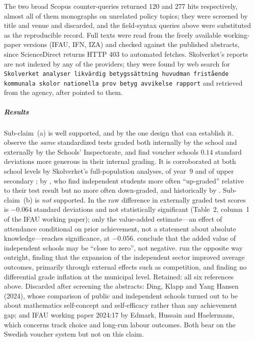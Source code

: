 The two broad Scopus counter-queries returned 120 and 277 hits
respectively, almost all of them monographs on unrelated policy topics;
they were screened by title and venue and discarded, and the field-syntax
queries above were substituted as the reproducible record.
Full texts were read from the freely available working-paper versions
(IFAU, IFN, IZA) and checked against the published abstracts, since
ScienceDirect returns HTTP 403 to automated fetches.
Skolverket's reports are not indexed by any of the providers; they were
found by web search for
\texttt{Skolverket analyser likvärdig betygssättning huvudman fristående
kommunala skolor nationella prov betyg avvikelse rapport} and retrieved
from the agency, after \textcite{EdmarkPersson2021} pointed to them.

\subparagraph{Results}
Sub-claim~(a) is well supported, and by the one design that can establish
it.  \Textcite{HinnerichVlachos2017} observe the \emph{same} standardized
tests graded both internally by the school and externally by the Schools'
Inspectorate, and find voucher schools \(0.14\) standard deviations more
generous in their internal grading.  It is corroborated at both school
levels by Skolverket's full-population analyses, of year~9
\autocite{Skolverket2019Betyg} and of upper secondary
\autocite{Skolverket2020Betyg}; by \textcite{EdmarkPersson2021}, who find independent
students more often \enquote{up-graded} relative to their test result but
no more often down-graded, and historically by
\textcite{WikstromWikstrom2005}.
Sub-claim~(b) is \emph{not} supported.  In
\textcite{HinnerichVlachos2017} the raw difference in externally graded
test scores is \(-0.064\) standard deviations and not statistically
significant (Table~2, column~1 of the IFAU working paper); only the
value-added estimate---an effect of attendance conditional on prior
achievement, not a statement about absolute knowledge---reaches
significance, at \(-0.056\).  \Textcite{EdmarkPersson2021} conclude that
the added value of independent schools may be \enquote{close to zero},
not negative.  \Textcite{BohlmarkLindahl2015} run the opposite way
outright, finding that the expansion of the independent sector improved
average outcomes, primarily through external effects such as competition,
and finding no differential grade inflation at the municipal level.
Retained: all six references above.
Discarded after screening the abstracts: Ding, Klapp and Yang Hansen
(2024), whose comparison of public and independent schools turned out to
be about mathematics self-concept and self-efficacy rather than any
achievement gap; and IFAU working paper 2024:17 by Edmark, Hussain and
Haelermans, which concerns track choice and long-run labour outcomes.
Both bear on the Swedish voucher system but not on this claim.

